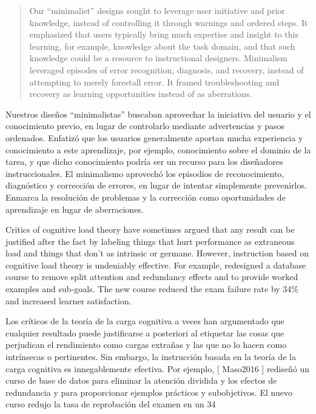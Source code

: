 \begin{quote}

  Our ``minimalist'' designs sought to leverage user initiative and prior knowledge,
  instead of controlling it through warnings and ordered steps.
  It emphasized that users typically bring much expertise and insight to this learning,
  for example,
  knowledge about the task domain,
  and that such knowledge could be a resource to instructional designers.
  Minimalism leveraged episodes of error recognition, diagnosis, and recovery,
  instead of attempting to merely forestall error.
  It framed troubleshooting and recovery as learning opportunities instead of as aberrations.

\end{quote}

Nuestros diseños “minimalistas” buscaban aprovechar la iniciativa del usuario y el conocimiento previo, en lugar de controlarlo mediante advertencias y pasos ordenados. Enfatizó que los usuarios generalmente aportan mucha experiencia y conocimiento a este aprendizaje, por ejemplo, conocimiento sobre el dominio de la tarea, y que dicho conocimiento podría ser un recurso para los diseñadores instruccionales. El minimalismo aprovechó los episodios de reconocimiento, diagnóstico y corrección de errores, en lugar de intentar simplemente prevenirlos. Enmarca la resolución de problemas y la corrección como oportunidades de aprendizaje en lugar de aberraciones.


Critics of cognitive load theory have sometimes argued that
any result can be justified after the fact by labeling things that hurt performance as extraneous load
and things that don't as intrinsic or germane.
However,
instruction based on cognitive load theory is undeniably effective.
For example,
\cite{Maso2016} redesigned a database course to remove split attention and redundancy effects
and to provide worked examples and sub-goals.
The new course reduced the exam failure rate by 34\%
and increased learner satisfaction.

Los críticos de la teoría de la carga cognitiva a veces han argumentado que cualquier resultado puede justificarse a posteriori al etiquetar las cosas que perjudican el rendimiento como cargas extrañas y las que no lo hacen como intrínsecas o pertinentes. Sin embargo, la instrucción basada en la teoría de la carga cognitiva es innegablemente efectiva. Por ejemplo, [ Maso2016 ] rediseñó un curso de base de datos para eliminar la atención dividida y los efectos de redundancia y para proporcionar ejemplos prácticos y subobjetivos. El nuevo curso redujo la tasa de reprobación del examen en un 34%


